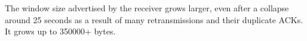The window size advertised by the receiver grows larger, even after a collapse around 25 seconds as a result of many retransmissions and their duplicate ACKs.
It grows up to 350000+ bytes.